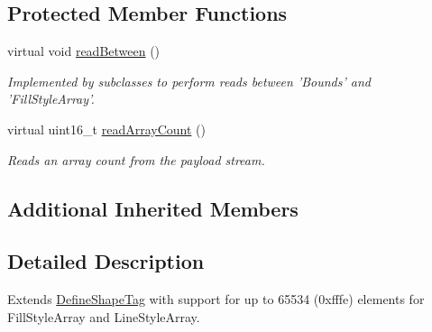 \subsection*{Protected Member Functions}
\begin{DoxyCompactItemize}
\item 
\hypertarget{classjswf_1_1flash_1_1tags_1_1_define_shape2_tag_a6e952275a3ad934e55f4ea481fe2f8e5}{virtual void \hyperlink{classjswf_1_1flash_1_1tags_1_1_define_shape2_tag_a6e952275a3ad934e55f4ea481fe2f8e5}{read\+Between} ()}\label{classjswf_1_1flash_1_1tags_1_1_define_shape2_tag_a6e952275a3ad934e55f4ea481fe2f8e5}

\begin{DoxyCompactList}\small\item\em Implemented by subclasses to perform reads between 'Bounds' and 'Fill\+Style\+Array'. \end{DoxyCompactList}\item 
virtual uint16\+\_\+t \hyperlink{classjswf_1_1flash_1_1tags_1_1_define_shape2_tag_a1a6b796a542d30359ee662b68f13c208}{read\+Array\+Count} ()
\begin{DoxyCompactList}\small\item\em Reads an array count from the payload stream. \end{DoxyCompactList}\end{DoxyCompactItemize}
\subsection*{Additional Inherited Members}


\subsection{Detailed Description}
Extends \hyperlink{classjswf_1_1flash_1_1tags_1_1_define_shape_tag}{Define\+Shape\+Tag} with support for up to 65534 (0xfffe) elements for {\ttfamily Fill\+Style\+Array} and {\ttfamily Line\+Style\+Array}. 


